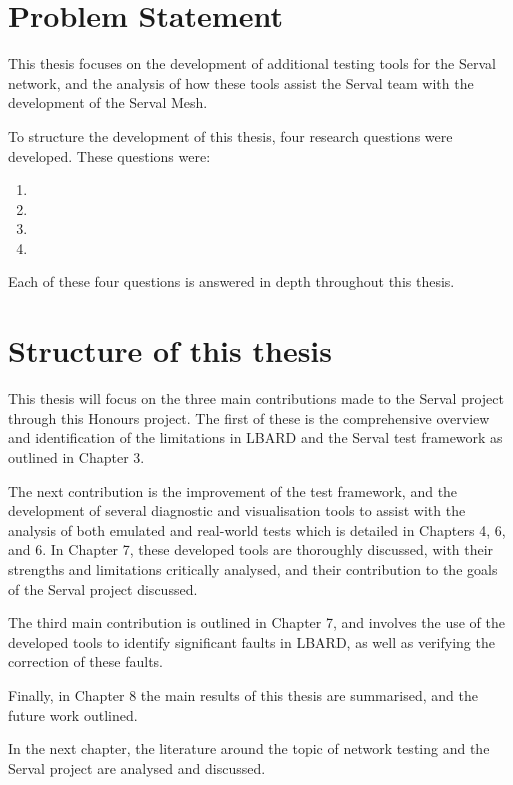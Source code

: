 \section{Problem Statement}
This thesis focuses on the development of additional testing tools for the Serval network, and the analysis of how these tools assist the Serval team with the development of the Serval Mesh.

To structure the development of this thesis, four research questions were developed.
These questions were:
\begin{enumerate}
    \item \firstRQ
    \item \secondRQ
    \item \thirdRQ
    \item \fourthRQ
\end{enumerate}
Each of these four questions is answered in depth throughout this thesis.


\section{Structure of this thesis}
This thesis will focus on the three main contributions made to the Serval project through this Honours project.
The first of these is the comprehensive overview and identification of the limitations in LBARD and the Serval test framework as outlined in Chapter 3.

The next contribution is the improvement of the test framework, and the development of several diagnostic and visualisation tools to assist with the analysis of both emulated and real-world tests which is detailed in Chapters 4, 6, and 6. 
In Chapter 7, these developed tools are thoroughly discussed, with their strengths and limitations critically analysed, and their contribution to the goals of the Serval project discussed.

The third main contribution is outlined in Chapter 7, and involves the use of the developed tools to identify significant faults in LBARD, as well as verifying the correction of these faults.

Finally, in Chapter 8 the main results of this thesis are summarised, and the future work outlined.

In the next chapter, the literature around the topic of network testing and the Serval project are analysed and discussed.

